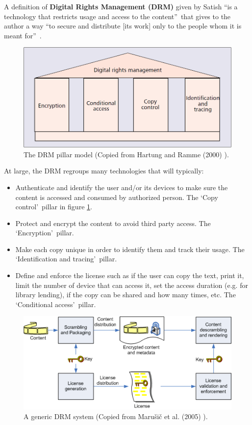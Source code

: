 \documentclass[11pt,a4paper,oneside]{memoir}
\begin{document}
A definition of \textbf{Digital Rights Management (DRM)} given by Satish \textquotedblleft is a technology that restricts usage and access to the content\textquotedblright ~that gives to the author a way \textquotedblleft to secure and distribute [its work] only to the people whom it is meant for\textquotedblright ~\cite[p. 4]{satish:drm}. 
\begin{figure}[h]
   \centering
   	\includegraphics[width=13cm]{drm_pillar}
   \caption{The DRM pillar model (Copied from Hartung and  Ramme (2000) \cite{ieee:drm_watermark}).}
   \label{fig:def:drm_pillar}
\end{figure}
At large, the DRM regroups many technologies that will typically:
\vspace{-17pt}\begin{itemize}
	\item Authenticate and identify the user and/or its devices to make sure the content is accessed and consumed by authorized person. The \textquoteleft Copy control\textquoteright ~pillar in figure \ref{fig:def:drm_pillar}.
	\item Protect and encrypt the content to avoid third party access. The \textquoteleft Encryption\textquoteright ~pillar.
	\item Make each copy unique in order to identify them and track their usage. The \textquoteleft Identification and tracing\textquoteright ~pillar.
	\item Define and enforce the license such as if the user can copy the text, print it, limit the number of device that can access it, set the access duration (e.g. for library lending), if the copy can be shared and how many times, etc. The \textquoteleft Conditional access\textquoteright ~pillar.
\end{itemize}

\begin{figure}[h]
   \centering
   	\includegraphics{indicare_drm}
   \caption{A generic DRM system (Copied from Maru\v{s}i\v{c} et al. (2005) \cite{indicare:tiramisu}).}
   \label{fig:def:drm_scheme}
\end{figure}
\end{document}
